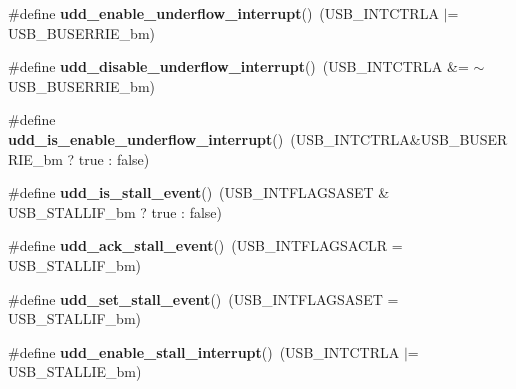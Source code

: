 \begin{DoxyCompactItemize}
\item 
\hypertarget{group__udd__xmega__usb__group_ga38f9d30defa87c5ceef9ee669960c3be}{\#define {\bfseries udd\-\_\-enable\-\_\-underflow\-\_\-interrupt}()~(U\-S\-B\-\_\-\-I\-N\-T\-C\-T\-R\-L\-A $|$= U\-S\-B\-\_\-\-B\-U\-S\-E\-R\-R\-I\-E\-\_\-bm)}\label{group__udd__xmega__usb__group_ga38f9d30defa87c5ceef9ee669960c3be}

\item 
\hypertarget{group__udd__xmega__usb__group_gac2705083518a59b07cb016c5f778a487}{\#define {\bfseries udd\-\_\-disable\-\_\-underflow\-\_\-interrupt}()~(U\-S\-B\-\_\-\-I\-N\-T\-C\-T\-R\-L\-A \&= $\sim$U\-S\-B\-\_\-\-B\-U\-S\-E\-R\-R\-I\-E\-\_\-bm)}\label{group__udd__xmega__usb__group_gac2705083518a59b07cb016c5f778a487}

\item 
\hypertarget{group__udd__xmega__usb__group_ga30465c69b0462296cdbf5885fb7367c7}{\#define {\bfseries udd\-\_\-is\-\_\-enable\-\_\-underflow\-\_\-interrupt}()~(U\-S\-B\-\_\-\-I\-N\-T\-C\-T\-R\-L\-A\&U\-S\-B\-\_\-\-B\-U\-S\-E\-R\-R\-I\-E\-\_\-bm ? true \-: false)}\label{group__udd__xmega__usb__group_ga30465c69b0462296cdbf5885fb7367c7}

\item 
\hypertarget{group__udd__xmega__usb__group_ga3ce6bf3f1364a3db5adad2d618459b48}{\#define {\bfseries udd\-\_\-is\-\_\-stall\-\_\-event}()~(U\-S\-B\-\_\-\-I\-N\-T\-F\-L\-A\-G\-S\-A\-S\-E\-T \& U\-S\-B\-\_\-\-S\-T\-A\-L\-L\-I\-F\-\_\-bm ? true \-: false)}\label{group__udd__xmega__usb__group_ga3ce6bf3f1364a3db5adad2d618459b48}

\item 
\hypertarget{group__udd__xmega__usb__group_ga5b5dd25a67eefeacf3a18570a8d96a31}{\#define {\bfseries udd\-\_\-ack\-\_\-stall\-\_\-event}()~(U\-S\-B\-\_\-\-I\-N\-T\-F\-L\-A\-G\-S\-A\-C\-L\-R = U\-S\-B\-\_\-\-S\-T\-A\-L\-L\-I\-F\-\_\-bm)}\label{group__udd__xmega__usb__group_ga5b5dd25a67eefeacf3a18570a8d96a31}

\item 
\hypertarget{group__udd__xmega__usb__group_ga8645203295e1f4b04a3adc0bbe94781a}{\#define {\bfseries udd\-\_\-set\-\_\-stall\-\_\-event}()~(U\-S\-B\-\_\-\-I\-N\-T\-F\-L\-A\-G\-S\-A\-S\-E\-T = U\-S\-B\-\_\-\-S\-T\-A\-L\-L\-I\-F\-\_\-bm)}\label{group__udd__xmega__usb__group_ga8645203295e1f4b04a3adc0bbe94781a}

\item 
\hypertarget{group__udd__xmega__usb__group_ga4be43672478e21671274893dbfa14155}{\#define {\bfseries udd\-\_\-enable\-\_\-stall\-\_\-interrupt}()~(U\-S\-B\-\_\-\-I\-N\-T\-C\-T\-R\-L\-A $|$= U\-S\-B\-\_\-\-S\-T\-A\-L\-L\-I\-E\-\_\-bm)}\label{group__udd__xmega__usb__group_ga4be43672478e21671274893dbfa14155}


\end{DoxyCompactItemize}
